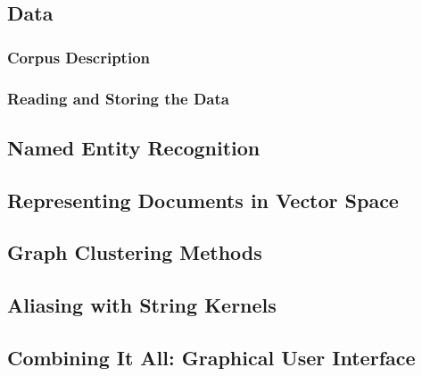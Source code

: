 \subsection{Data}\label{sec:data}
\subsubsection{Corpus Description}\label{sec:description_of_the_castro_archive}

\subsubsection{Reading and Storing the Data}\label{sec:reading_and_storing_the_data}

\subsection{Named Entity Recognition}\label{sec:stanford_named_entity_recognizer}


\subsection{Representing Documents in Vector Space}\label{sec:representing_documents_in_vector_space}


\subsection{Graph Clustering Methods}\label{sec:graph_clustering_methods}


\subsection{Aliasing with String Kernels}\label{sec:aliasing}


\subsection{Combining It All: Graphical User Interface}\label{sec:gui}

